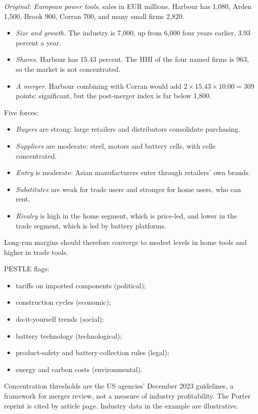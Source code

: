 \begin{qfmethod}
 \emph{Original: European power tools}, sales in EUR millions. Harbour has 1,080, Arden 1,500, Brook 900, Corran 700, and many small firms 2,820.
\begin{itemize}
\item \emph{Size and growth.} The industry is 7,000, up from 6,000 four years earlier, 3.93 percent a year.
\item \emph{Shares.} Harbour has 15.43 percent. The HHI of the four named firms is 963, so the market is not concentrated.
\item \emph{A merger.} Harbour combining with Corran would add $2\times15.43\times10.00=309$ points: significant, but the post-merger index is far below 1,800.
\end{itemize}

Five forces:
\begin{itemize}
\item \emph{Buyers} are strong: large retailers and distributors consolidate purchasing.
\item \emph{Suppliers} are moderate: steel, motors and battery cells, with cells concentrated.
\item \emph{Entry} is moderate: Asian manufacturers enter through retailers' own brands.
\item \emph{Substitutes} are weak for trade users and stronger for home users, who can rent.
\item \emph{Rivalry} is high in the home segment, which is price-led, and lower in the trade segment, which is led by battery platforms.
\end{itemize}
Long-run margins should therefore converge to modest levels in home tools and higher in trade tools.

PESTLE flags:
\begin{itemize}
\item tariffs on imported components (political);
\item construction cycles (economic);
\item do-it-yourself trends (social);
\item battery technology (technological);
\item product-safety and battery-collection rules (legal);
\item energy and carbon costs (environmental).
\end{itemize}

 Concentration thresholds are the US agencies' December 2023 guidelines, a framework for merger review, not a measure of industry profitability. The Porter reprint is cited by article page. Industry data in the example are illustrative.


\end{qfmethod}

